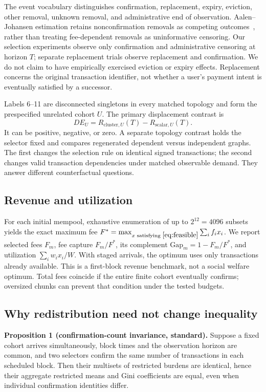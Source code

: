 \documentclass[conference]{IEEEtran}
\begin{document}
The event vocabulary distinguishes confirmation, replacement, expiry, eviction, other removal, unknown removal, and administrative end of observation. Aalen--Johansen estimation retains nonconfirmation removals as competing outcomes~\cite{aalen1978,andersen2012}, rather than treating fee-dependent removals as uninformative censoring. Our selection experiments observe only confirmation and administrative censoring at horizon $T$; separate replacement trials observe replacement and confirmation. We do not claim to have empirically exercised eviction or expiry effects. Replacement concerns the original transaction identifier, not whether a user's payment intent is eventually satisfied by a successor.

Labels 6--11 are disconnected singletons in every matched topology and form the prespecified unrelated cohort $U$. The primary displacement contrast is
\begin{equation}
 DE_U=R_{\mathrm{cluster},U}(T)-R_{\mathrm{scalar},U}(T).
\end{equation}
It can be positive, negative, or zero. A separate topology contrast holds the selector fixed and compares regenerated dependent versus independent graphs. The first changes the selection rule on identical signed transactions; the second changes valid transaction dependencies under matched observable demand. They answer different counterfactual questions.

\subsection{Revenue and utilization}
For each initial mempool, exhaustive enumeration of up to $2^{12}=4096$ subsets yields the exact maximum fee $F^*=\max_{x\text{ satisfying }\eqref{eq:feasible}}\sum_i f_ix_i$. We report selected fees $F_m$, fee capture $F_m/F^*$, its complement $\mathrm{Gap}_m=1-F_m/F^*$, and utilization $\sum_iw_ix_i/W$. With staged arrivals, the optimum uses only transactions already available. This is a first-block revenue benchmark, not a social welfare optimum. Total fees coincide if the entire finite cohort eventually confirms; oversized chunks can prevent that condition under the tested budgets.

\subsection{Why redistribution need not change inequality}
\textbf{Proposition 1 (confirmation-count invariance, standard).} Suppose a fixed cohort arrives simultaneously, block times and the observation horizon are common, and two selectors confirm the same number of transactions in each scheduled block. Then their multisets of restricted burdens are identical, hence their aggregate restricted means and Gini coefficients are equal, even when individual confirmation identities differ.
\end{document}
